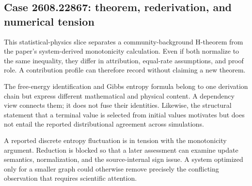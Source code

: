 \subsection{Case 2608.22867: theorem, rederivation, and numerical tension}\label{case:contrib-22867}

This statistical-physics slice separates a community-background H-theorem from the paper's system-derived monotonicity calculation. Even if both normalize to the same inequality, they differ in attribution, equal-rate assumptions, and proof role. A contribution profile can therefore record  without claiming a new theorem.

The free-energy identification and Gibbs entropy formula belong to one derivation chain but express different mathematical and physical content. A dependency view connects them; it does not fuse their identities. Likewise, the structural statement that a terminal value is selected from initial values motivates but does not entail the reported distributional agreement across simulations.

A reported discrete entropy fluctuation is in tension with the monotonicity argument. Reduction is blocked so that a later assessment can examine update semantics, normalization, and the source-internal sign issue. A system optimized only for a smaller graph could otherwise remove precisely the conflicting observation that requires scientific attention.